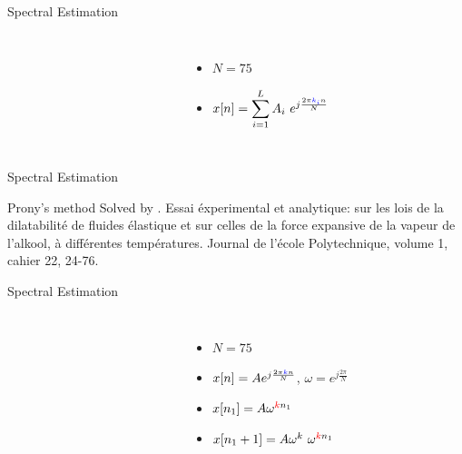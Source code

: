 \documentclass[10pt,xcolor=table]{beamer}
\begin{document}
\begin{frame}{Spectral Estimation}
	
	\begin{columns}
		
		\begin{figure}
			\centering
			\scalebox{0.60}{}
		\end{figure}
		
		\begin{figure}
			\centering
			\scalebox{0.60}{}
		\end{figure}

        \begin{itemize}
        \item $N=75$
        \item $x[n] = \displaystyle{\sum_{i=1}^L A_i \ e^{j \frac{2 \pi {\color{blue}{k_i}} n}{N}}}$
		\end{itemize}
	\end{columns}	
\end{frame}
\begin{frame}{Spectral Estimation}
\begin{block}{Prony's method}
Solved by {\color{blue}{Baron Gaspard Riche de Prony (1795)}}. Essai éxperimental et analytique: sur les lois de la dilatabilité de fluides élastique et sur celles de la force expansive de la vapeur de l'alkool, à différentes températures. Journal de l'école Polytechnique, volume 1, cahier 22, 24-76.
\end{block}
\begin{figure}
  \centering
\end{figure}
\end{frame}
\begin{frame}{Spectral Estimation}
	
	\begin{columns}
		
		\column{0.35\textwidth}
		\begin{figure}
			\centering
			\scalebox{0.60}{}
		\end{figure}
		
		\column{0.45\textwidth}
		\begin{figure}
			\centering
			\scalebox{0.60}{}
		\end{figure}

        \begin{itemize}
        \item $N=75$
        \item $x[n] = A e^{j \frac{2 \pi {\color{blue}{k}} n}{N}}$, $\omega = e^{j \frac{2 \pi}{N}}$
        \pause
        \item $x[n_1] = A \omega^{{\color{red}{k}}n_1}$
        \item $x[n_1+1] = A \omega^k \ \omega^{{\color{red}{k}}n_1}$
		\end{itemize}
	\end{columns}	
\end{frame}
\end{document}
